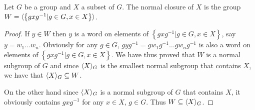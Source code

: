 \begin{theorem}
    Let $G$ be a group and $X$ a subset of $G$. The normal closure of $X$ is the group $W = \langle \left\{gxg^{-1}|g \in G, x \in X\right\} \rangle$. 
\end{theorem}

\begin{proof}
    If $y \in W$ then $y$ is a word on elements of $\left\{gxg^{-1}|g \in G, x \in X\right\}$, say $y = w_1\ldots w_n$. Obviously for any $g \in G$, $gyg^{-1} =gw_1g^{-1}\ldots gw_ng^{-1}$ is also a word on elements of $\left\{gxg^{-1}|g \in G, x \in X\right\}$. We have thus proved that $W$ is a normal subgroup of $G$ and since $\langle X \rangle_G$ is the smallest normal subgroup that contains $X$, we have that $\langle X \rangle_G \subseteq W$.
    
    On the other hand since $\langle X \rangle_G$ is a normal subgroup of $G$ that contains $X$, it obviously contains $gxg^{-1}$ for any $x \in X$, $g \in G$. Thus $W \subseteq \langle X \rangle_G$.
\end{proof}